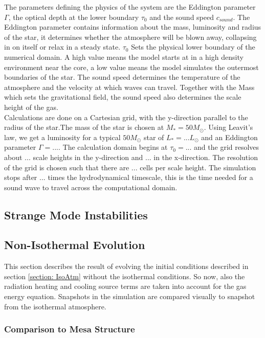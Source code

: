 The parameters defining the physics of the system are the Eddington parameter $\Gamma$, the optical depth at the lower boundary $\tau_0$ and the sound speed $c_{sound}$. The Eddington parameter contains information about the mass, luminosity and radius of the star, it determines whether the atmosphere will be blown away, collapsing in on itself or relax in a steady state. $\tau_0$ Sets the physical lower boundary of the numerical domain. A high value means the model starts at in a high density environment near the core, a low value means the model simulates the outermost boundaries of the star. The sound speed determines the temperature of the atmosphere and the velocity at which waves can travel. Together with the Mass which sets the gravitational field, the sound speed also determines the scale height of the gas. \\

Calculations are done on a Cartesian grid, with the y-direction parallel to the radius of the star.The mass of the star is chosen at $M_* = 50 M_\odot$. Using Leavit's law, we get a luminosity for a typical $50M_\odot$ star of $L_* = ... L_\odot$ and an Eddington parameter $\Gamma = ...$. The calculation domain begins at $\tau_0 = ...$ and the grid resolves about $...$ scale heights in the y-direction and $...$ in the x-direction. The resolution of the grid is chosen such that there are $...$ cells per scale height. The simulation stops after $...$ times the hydrodynamical timescale, this is the time needed for a sound wave to travel across the computational domain. 

\subsection{Strange Mode Instabilities}

\subsection{Non-Isothermal Evolution}
This section describes the result of evolving the initial conditions described in section \ref{section: IsoAtm} without the isothermal conditions. So now, also the radiation heating and cooling source terms are taken into account for the gas energy equation. Snapshots in the simulation are compared visually to snapshot from the isothermal atmosphere.

\subsubsection{Comparison to Mesa Structure}

